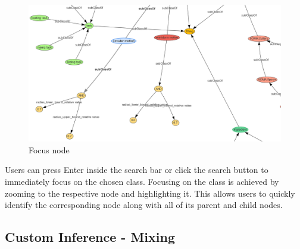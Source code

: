\begin{figure}[H]
    \includegraphics[scale=0.25]{Graphics/OwlVisualizer/searchClass2.png}
    \centering
    \caption{Focus node}
\end{figure}

Users can press Enter inside the search bar or click the search button to immediately focus on the chosen class. 
Focusing on the class is achieved by zooming to the respective node and highlighting it. 
This allows users to quickly identify the corresponding node along with all of its parent and child nodes.

\subsection{Custom Inference - Mixing}

